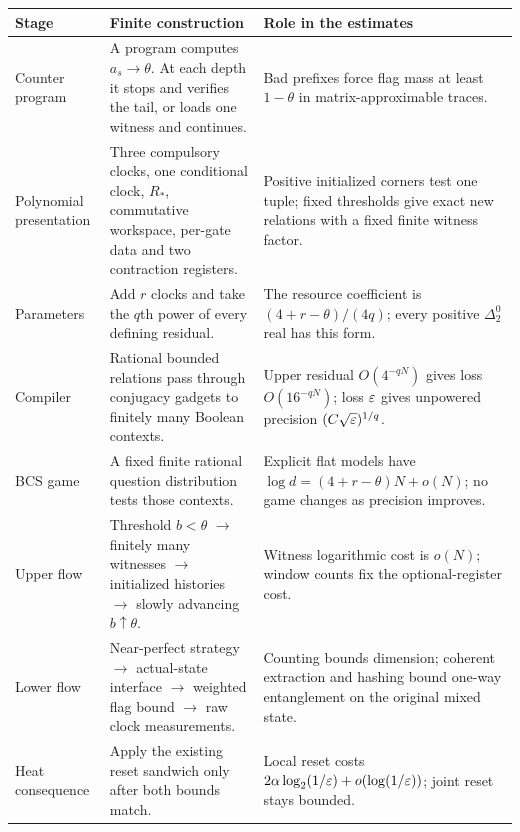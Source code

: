 \medskip
\renewcommand{\arraystretch}{1.35}
\small
\noindent\begin{tabular}{@{}>{\raggedright\arraybackslash}p{}>{\raggedright\arraybackslash}p{}>{\raggedright\arraybackslash}p{}@{}}
\toprule
Stage & Finite construction & Role in the estimates\\
\midrule
Counter program & A program computes $a_s\to\theta$. At each depth it stops and verifies the tail, or loads one witness and continues. & Bad prefixes force flag mass at least $1-\theta$ in matrix-approximable traces.\\
Polynomial presentation & Three compulsory clocks, one conditional clock, $R_*$, commutative workspace, per-gate data and two contraction registers. & Positive initialized corners test one tuple; fixed thresholds give exact new relations with a fixed finite witness factor.\\
Parameters & Add $r$ clocks and take the $q$th power of every defining residual. & The resource coefficient is $(4+r-\theta)/(4q)$; every positive $\Delta^0_2$ real has this form.\\
Compiler & Rational bounded relations pass through conjugacy gadgets to finitely many Boolean contexts. & Upper residual $O(4^{-qN})$ gives loss $O(16^{-qN})$; loss $\varepsilon$ gives unpowered precision $(C\sqrt{\varepsilon})^{1/q}$.\\
BCS game & A fixed finite rational question distribution tests those contexts. & Explicit flat models have $\log d=(4+r-\theta)N+o(N)$; no game changes as precision improves.\\
\midrule
Upper flow & Threshold $b<\theta$ $\to$ finitely many witnesses $\to$ initialized histories $\to$ slowly advancing $b\uparrow\theta$. & Witness logarithmic cost is $o(N)$; window counts fix the optional-register cost.\\
Lower flow & Near-perfect strategy $\to$ actual-state interface $\to$ weighted flag bound $\to$ raw clock measurements. & Counting bounds dimension; coherent extraction and hashing bound one-way entanglement on the original mixed state.\\
Heat consequence & Apply the existing reset sandwich only after both bounds match. & Local reset costs $2\alpha\log_2(1/\varepsilon)+o(\log(1/\varepsilon))$; joint reset stays bounded.\\
\bottomrule
\end{tabular}\par
\normalsize
\renewcommand{\arraystretch}{1}
\clearpage

